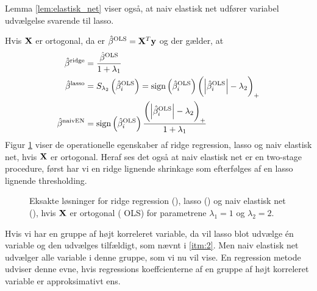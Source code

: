 Lemma \ref{lem:elastisk_net} viser også, at naiv  elastisk net udfører variabel udvælgelse svarende til lasso.
%
\begin{exmp}
Hvis \(\mathbf{X}\) er ortogonal, da er \(\hat{\beta}^\text{OLS} = \mathbf{X}^T \mathbf{y}\) og der gælder, at
\begin{align*}
\hat{\beta}^\text{ridge} &= \frac{\hat{\beta}^\text{OLS}}{1+\lambda_1} \\
\hat{\beta}^\text{lasso} &= S_{\lambda_2} \del{ \hat{\beta}_i^\text{OLS}} =  \text{sign} \del{\hat{\beta}_i^\text{OLS}} \del{\left\vert \hat{\beta}_i^\text{OLS} \right\vert - \lambda_2}_+ \\
\hat{\beta}^\text{naivEN} &= \text{sign} \del{\hat{\beta}_i^\text{OLS}} \frac{\del{\left\vert \hat{\beta}_i^\text{OLS} \right\vert - \lambda_2}_+}{1+\lambda_1}
\end{align*}
Figur \ref{fig:elastisk2} viser de operationelle egenskaber af ridge regression, lasso og naiv elastisk net, hvis \(\mathbf{X}\) er ortogonal. Heraf ses det også at naiv elastisk net er en two-stage procedure, først har vi en ridge lignende shrinkage som efterfølges af en lasso lignende thresholding.
%
\begin{figure}[H]
\centering
\scalebox{0.8}{}
\caption[optional short text]{Eksakte løsninger for ridge regression (), lasso () og naiv elastisk net (), hvis \(\mathbf{X}\) er ortogonal ( OLS) for parametrene \(\lambda_1=1\) og \(\lambda_2=2\).} \label{fig:elastisk2}
\end{figure}
%
\end{exmp}
%
Hvis vi har en gruppe af højt korreleret variable, da vil lasso blot udvælge én variable og den udvælges tilfældigt, som nævnt i \ref{itm:2}.
Men naiv elastisk net udvælger alle variable i denne gruppe, som vi nu vil vise. 
En regression metode udviser denne evne, hvis regressions koeffcienterne af en gruppe af højt korreleret variable er approksimativt ens.

